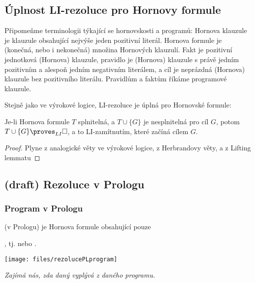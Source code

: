 \subsection{Úplnost LI-rezoluce pro Hornovy formule}

Připomeňme terminologii týkající se hornovskosti a programů: \alert{Hornova klauzule} je klauzule obsahující nejvýše jeden pozitivní literál. \alert{Hornova formule} je (konečná, nebo i nekonečná) množina Hornových klauzulí.
\alert{Fakt} je pozitivní jednotková (Hornova) klauzule, \alert{pravidlo} je (Hornova) klauzule s právě jedním pozitivním a alespoň jedním negativním literálem, a \alert{cíl} je neprázdná (Hornova) klauzule bez pozitivního literálu. Pravidlům a faktům říkáme \alert{programové klauzule}.

Stejně jako ve výrokové logice, LI-rezoluce je úplná pro Hornovské formule:

\begin{theorem}\label{theorem:completeness-of-li-resolution-for-horn-predicate}
Je-li Hornova formule $T$ splnitelná, a $T\cup\{G\}$ je nesplnitelná pro cíl $G$, potom $T\cup\{G\}\proves_{LI}\square$, a to LI-zamítnutím, které začíná cílem $G$.   
\end{theorem}
\begin{proof}
    Plyne z analogické věty ve výrokové logice, z Herbrandovy věty, a z Lifting lemmatu
\end{proof}


\subsection{(draft) Rezoluce v Prologu}\todo

\subsubsection*{Program v Prologu}
     (v Prologu) je Hornova formule obsahující pouze 
    \smallskip
    
    , tj.  nebo .
    \bigskip
    
    \centerline{\texttt{[image: files/rezolucePLprogram]}}
    \bigskip
    
    {\it Zajímá nás, zda daný  vyplývá z daného programu.}%
    \medskip
    
